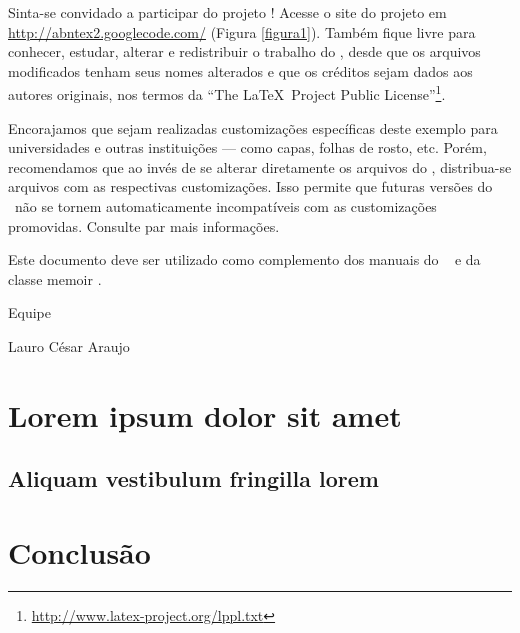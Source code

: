 \documentclass[
	12pt,				%
    oneside,			%
	a4paper,			%
	english,			%
	french,				%
	spanish,			%
	brazil,				%
	]{abntex2}
\begin{document}
Sinta-se convidado a participar do projeto \abnTeX! Acesse o site do projeto em
\url{http://abntex2.googlecode.com/} (Figura \ref{figura1}). Também fique livre para conhecer,
estudar, alterar e redistribuir o trabalho do \abnTeX, desde que os arquivos
modificados tenham seus nomes alterados e que os créditos sejam dados aos
autores originais, nos termos da ``The \LaTeX\ Project Public
License''\footnote{\url{http://www.latex-project.org/lppl.txt}}.

Encorajamos que sejam realizadas customizações específicas deste exemplo para
universidades e outras instituições --- como capas, folhas de rosto, etc.
Porém, recomendamos que ao invés de se alterar diretamente os arquivos do
\abnTeX, distribua-se arquivos com as respectivas customizações.
Isso permite que futuras versões do \abnTeX~não se tornem automaticamente
incompatíveis com as customizações promovidas. Consulte
 par mais informações.

Este documento deve ser utilizado como complemento dos manuais do \abnTeX\ 
\cite{abntex2classe,abntex2cite,abntex2cite-alf} e da classe \textsf{memoir}
\cite{memoir}. 

Equipe \abnTeX 

Lauro César Araujo


\chapter{Lorem ipsum dolor sit amet}

\section{Aliquam vestibulum fringilla lorem}

\lipsum[1]  %

\lipsum[2-3]



\chapter*[Conclusão]{Conclusão}

\lipsum[31-33]


\postextual
\end{document}

